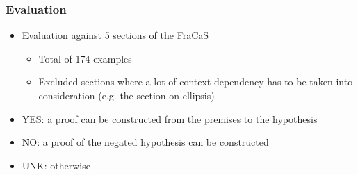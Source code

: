 \documentclass[11pt]{beamer}
\begin{document}
\begin{frame}[fragile]
	\frametitle{Evaluation}
	
	\begin{itemize}
		
		\item Evaluation against 5 sections of the FraCaS
		
		\begin{itemize}
			
			\item Total of 174 examples
		
		\item Excluded sections where a lot of context-dependency has to be taken into consideration (e.g. the section on ellipsis)
		
\end{itemize}

\item YES: a proof
can be constructed from the premises to the hypothesis

\item NO: a proof
of the negated hypothesis can be constructed

\item UNK: otherwise

\end{itemize}
\end{frame}		
		
\end{document}
